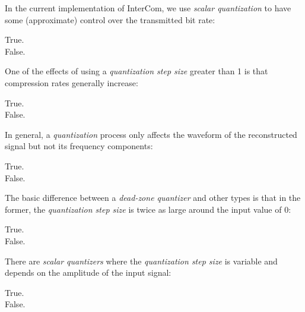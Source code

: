 \documentclass[legalpaper, 12pt, addpoints]{exam}
\begin{document}
\begin{questions}
\vspace{0.10in}

\question In the current implementation of InterCom, we use \emph{scalar quantization} to have some (approximate) control over the transmitted bit rate:

\begin{oneparchoices}
  \choice True.\\
  \choice False.
\end{oneparchoices}
  
\vspace{0.10in}

\question One of the effects of using a \emph{quantization step size} greater than 1 is that compression rates generally increase:

\begin{oneparchoices}
  \choice True.\\
  \choice False.
\end{oneparchoices}
  
\vspace{0.10in}

\question In general, a \emph{quantization} process only affects the waveform of the reconstructed signal but not its frequency components:

\begin{oneparchoices}
  \choice True.\\
  \choice False.
\end{oneparchoices}
  
\vspace{0.10in}

\question The basic difference between a \emph{dead-zone quantizer} and other types is that in the former, the \emph{quantization step size} is twice as large around the input value of 0:

\begin{oneparchoices}
  \choice True.\\
  \choice False.
\end{oneparchoices}
  
\vspace{0.10in}

\question There are \emph{scalar quantizers} where the \emph{quantization step size} is variable and depends on the amplitude of the input signal:

\begin{oneparchoices}
  \choice True.\\
  \choice False.
\end{oneparchoices}
  

\end{questions}
\end{document}
